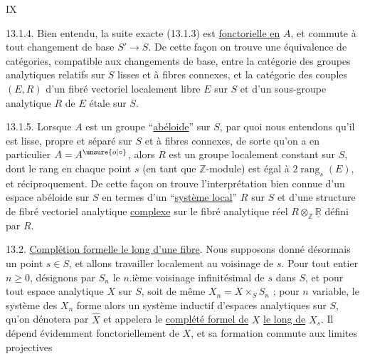 \hfill IX

13.1.4. Bien entendu, la suite exacte (13.1.3) est \uline{fonctorielle en} $A$, et commute à tout changement de base $S'\longrightarrow S$. De cette façon on trouve une équivalence de catégories, compatible aux changements de base, entre la catégorie des groupes analytiques relatifs sur $S$ lisses et à fibres connexes, et la catégorie des couples $(E,R)$ d'un fibré vectoriel localement libre $E$ sur $S$ et d'un sous-groupe analytique $R$ de $E$ étale sur $S$.

13.1.5. Lorsque $A$ est un groupe ``\uline{abéloide}'' sur $S$, par quoi nous entendons qu'il est lisse, propre et séparé sur $S$ et à fibres connexes, de sorte qu'on a en particulier $A=A^{\unsure{o|\circ}}$, alors $R$ est un groupe localement constant sur $S$, dont le rang en chaque point $s$ (en tant que $\mathbb Z$-module) est égal à $2\operatorname{rang}_s(E)$, et réciproquement. De cette façon on trouve l'interprétation bien connue d'un espace abéloide sur $S$ en termes d'un ``\uline{système local}'' $R$ sur $S$ et d'une structure de fibré vectoriel analytique \uline{complexe} sur le fibré analytique réel $R\otimes_{\mathbb Z}\underline{\mathbb R}$ défini par $R$.

13.2. \uline{Complétion formelle le long d'une fibre}. Nous supposons donné désormais un point $s\in S$, et allons travailler localement au voisinage de $s$. Pour tout entier $n\geq0$, désignons par $S_n$ le $n$.ième voisinage infinitésimal de $s$ dans $S$, et pour tout espace analytique $X$ sur $S$, soit de même $X_n=X\times_S S_n$ ; pour $n$ variable, le système des $X_n$ forme alors un système inductif d'espaces analytiques sur $S$, qu'on dénotera par $\hat X$ et appelera le \uline{complété formel de} $X$ \uline{le long de} $X_s$. Il dépend évidemment fonctoriellement de $X$, et sa formation commute aux limites projectives

